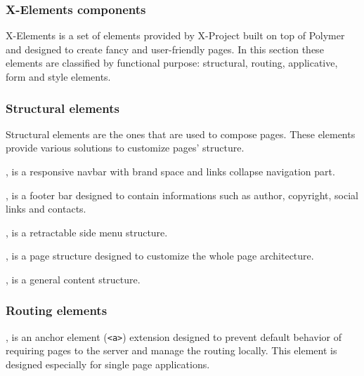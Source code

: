 \documentclass{sig-alternate}
\begin{document}
\subsubsection{X-Elements components}

X-Elements is a set of elements provided by X-Project built on top of Polymer and designed to create fancy and user-friendly pages. In this section these elements are classified by functional purpose: structural, routing, applicative, form and style elements.




\subsubsection{Structural elements}

Structural elements are the ones that are used to compose pages. These elements provide various solutions to customize pages' structure.

\begin{description}
\itemsep1pt\parskip0pt
       \item[x-header], is a responsive navbar with brand space and links collapse navigation part.
       \item[x-footer], is a footer bar designed to contain informations such as author, copyright, social links and contacts.
       \item[x-drawer], is a retractable side menu structure.
       \item[x-page], is a page structure designed to customize the whole page architecture.
       \item[x-content], is a general content structure.
\end{description}





\subsubsection{Routing elements}

\begin{description}
\itemsep1pt\parskip0pt
      \item[x-link], is an anchor element ({\tt <a>}) extension designed to prevent default behavior of requiring pages to the server and manage the routing locally. This element is designed especially for single page applications.
\end{description}
\end{document}
